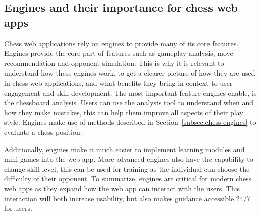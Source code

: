 \subsection{Engines and their importance for chess web apps}\label{subsec:webapps-engines}

Chess web applications rely on engines to provide many of its core features.
Engines provide the core part of features such as gameplay analysis,
move recommendation and opponent simulation.
This is why it is relevant to understand how these engines work,
to get a clearer picture of how they are used in chess web applications,
and what benefits they bring in context to user engagement and skill
development.
The most important feature engines enable, is the chessboard analysis.
Users can use the analysis tool to understand when and how they make mistakes,
this can help them improve all aspects of their play style.
Engines make use of methods described in Section~\ref{subsec:chess-engines}
to evaluate a chess position.

Additionally, engines make it much easier to implement learning modules
and mini-games into the web app.
More advanced engines also have the capability to change skill level,
this can be used for training as the individual can choose the difficulty of
their opponent.
To summarize, engines are critical for modern chess web apps as they
expand how the web app can interact with the users.
This interaction will both increase usability, but also makes guidance accessible
24/7 for users.

